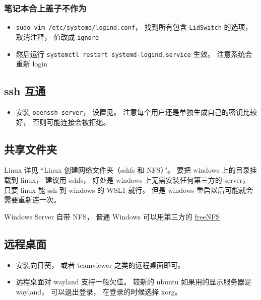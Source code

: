 \subsubsection{笔记本合上盖子不作为}
\begin{itemize}
\item \verb|sudo vim /etc/systemd/logind.conf|， 找到所有包含 \verb|LidSwitch| 的选项， 取消注释， 值改成 \verb|ignore|
\item 然后运行 \verb|systemctl restart systemd-logind.service| 生效。 注意系统会重新 login
\end{itemize}


\subsection{ssh 互通}
\begin{itemize}
\item 安装 \verb|openssh-server|， 设置见。 注意每个用户还是单独生成自己的密钥比较好， 否则可能连接会被拒绝。
\end{itemize}

\subsection{共享文件夹}
Linux 详见 “Linux 创建网络文件夹（sshfs 和 NFS）”。 要把 windows 上的目录挂载到 linux， 建议用 sshfs， 好处是 windows 上无需安装任何第三方的 server， 只要 linux 能 ssh 到 windows 的 WSL1 就行。 但是 windows 重启以后可能就会需要重新连一次。

Windows Server 自带 NFS， 普通 Windows 可以用第三方的 \href{https://sourceforge.net/projects/freenfs/files/latest/download}{freeNFS}

\subsection{远程桌面}
\begin{itemize}
\item 安装向日葵， 或者 teamviewer 之类的远程桌面即可。
\item 远程桌面对 wayland 支持一般欠佳。 较新的 ubuntu 如果用的显示服务器是 wayland， 可以退出登录， 在登录的时候选择 xorg。
\end{itemize}
